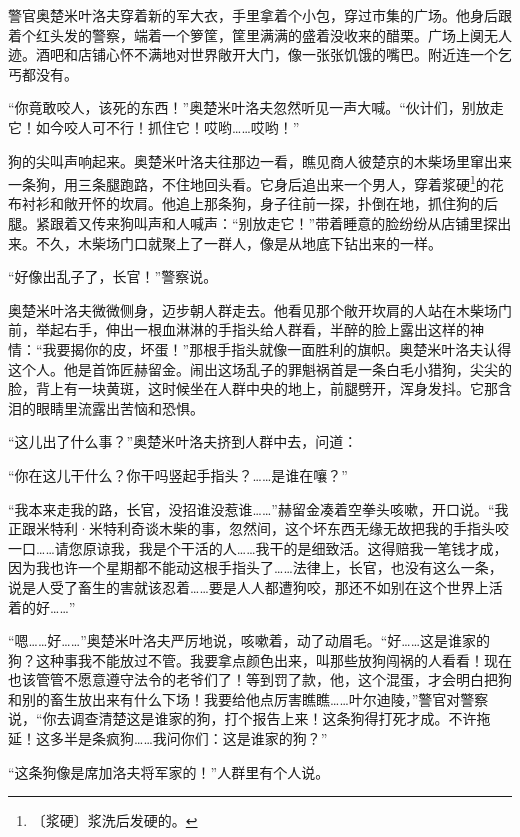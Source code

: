 \documentclass[12pt,UTF-8,openany]{ctexbook}
\begin{document}
\begin{large}
    
    警官奥楚米叶洛夫穿着新的军大衣，手里拿着个小包，穿过市集的广场。他身后跟着个红头发的警察，端着一个箩筐，筐里满满的盛着没收来的醋栗。广场上阒无人迹。酒吧和店铺心怀不满地对世界敞开大门，像一张张饥饿的嘴巴。附近连一个乞丐都没有。
    
    “你竟敢咬人，该死的东西！”奥楚米叶洛夫忽然听见一声大喊。“伙计们，别放走它！如今咬人可不行！抓住它！哎哟……哎哟！”
    
    狗的尖叫声响起来。奥楚米叶洛夫往那边一看，瞧见商人彼楚京的木柴场里窜出来一条狗，用三条腿跑路，不住地回头看。它身后追出来一个男人，穿着浆硬\footnote{〔浆硬〕浆洗后发硬的。}的花布衬衫和敞开怀的坎肩。他追上那条狗，身子往前一探，扑倒在地，抓住狗的后腿。紧跟着又传来狗叫声和人喊声：“别放走它！”带着睡意的脸纷纷从店铺里探出来。不久，木柴场门口就聚上了一群人，像是从地底下钻出来的一样。
    
    “好像出乱子了，长官！”警察说。
    
    奥楚米叶洛夫微微侧身，迈步朝人群走去。他看见那个敞开坎肩的人站在木柴场门前，举起右手，伸出一根血淋淋的手指头给人群看，半醉的脸上露出这样的神情：“我要揭你的皮，坏蛋！”那根手指头就像一面胜利的旗帜。奥楚米叶洛夫认得这个人。他是首饰匠赫留金。闹出这场乱子的罪魁祸首是一条白毛小猎狗，尖尖的脸，背上有一块黄斑，这时候坐在人群中央的地上，前腿劈开，浑身发抖。它那含泪的眼睛里流露出苦恼和恐惧。
    
    “这儿出了什么事？”奥楚米叶洛夫挤到人群中去，问道：
    
    “你在这儿干什么？你干吗竖起手指头？……是谁在嚷？”
    
    “我本来走我的路，长官，没招谁没惹谁……”赫留金凑着空拳头咳嗽，开口说。“我正跟米特利·米特利奇谈木柴的事，忽然间，这个坏东西无缘无故把我的手指头咬一口……请您原谅我，我是个干活的人……我干的是细致活。这得赔我一笔钱才成，因为我也许一个星期都不能动这根手指头了……法律上，长官，也没有这么一条，说是人受了畜生的害就该忍着……要是人人都遭狗咬，那还不如别在这个世界上活着的好……”
    
    “嗯……好……”奥楚米叶洛夫严厉地说，咳嗽着，动了动眉毛。“好……这是谁家的狗？这种事我不能放过不管。我要拿点颜色出来，叫那些放狗闯祸的人看看！现在也该管管不愿意遵守法令的老爷们了！等到罚了款，他，这个混蛋，才会明白把狗和别的畜生放出来有什么下场！我要给他点厉害瞧瞧……叶尔迪陵，”警官对警察说，“你去调查清楚这是谁家的狗，打个报告上来！这条狗得打死才成。不许拖延！这多半是条疯狗……我问你们：这是谁家的狗？”
    
    “这条狗像是席加洛夫将军家的！”人群里有个人说。
    

\end{large}
\end{document}
